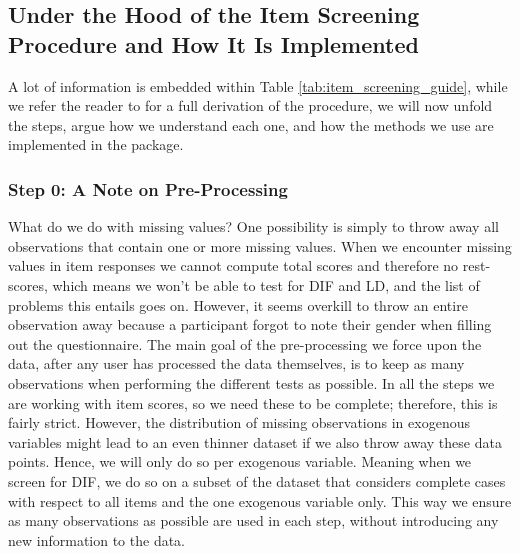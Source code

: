 \documentclass[a4project,12pt]{article}
\theoremstyle{examplestyle}
\theoremstyle{defstyle}
\theoremstyle{thmstyle}
\begin{document}
\subsection{Under the Hood of the Item Screening Procedure and How It Is Implemented}
A lot of information is embedded within Table \ref{tab:item_screening_guide}, while we refer the reader to \cite{kreiner-christensen-2011} for a full derivation of the procedure, we will now unfold the steps, argue how we understand each one, and how the methods we use are implemented in the package. 

\subsubsection{Step 0: A Note on Pre-Processing}
What do we do with missing values? One possibility is simply to throw away all observations that contain one or more missing values. When we encounter missing values in item responses we cannot compute total scores and therefore no rest-scores, which means we won't be able to test for DIF and LD, and the list of problems this entails goes on. However, it seems overkill to throw an entire observation away because a participant forgot to note their gender when filling out the questionnaire. The main goal of the pre-processing we force upon the data, after any user has processed the data themselves, is to keep as many observations when performing the different tests as possible. In all the steps we are working with item scores, so we need these to be complete; therefore, this is fairly strict. However, the distribution of missing observations in exogenous variables might lead to an even thinner dataset if we also throw away these data points. Hence, we will only do so per exogenous variable. Meaning when we screen for DIF, we do so on a subset of the dataset that considers complete cases with respect to all items and the one exogenous variable only. This way we ensure as many observations as possible are used in each step, without introducing any new information to the data. 
\end{document}
